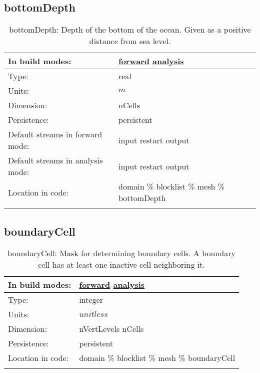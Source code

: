 \subsection[bottomDepth]{bottomDepth}
\label{subsec:var_sec_mesh_bottomDepth}
\begin{center}
\begin{longtable}{| p{2.0in} | p{4.0in} |}
        \hline 
        In build modes: & \hyperref[subsec:forward_var_tab_mesh]{forward} \hyperref[subsec:analysis_var_tab_mesh]{analysis} \\
        \hline 
        Type: & real \\
        \hline 
        Units: & $m$ \\
        \hline 
        Dimension: & nCells \\
        \hline 
        Persistence: & persistent \\
        \hline 
		 Default streams in forward mode: &  input restart output \\
        \hline 
		 Default streams in analysis mode: &  input restart output \\
        \hline 
		 Location in code: & domain \% blocklist \% mesh \% bottomDepth \\
		 \hline 
    \caption{bottomDepth: Depth of the bottom of the ocean. Given as a positive distance from sea level.}
\end{longtable}
\end{center}
\subsection[boundaryCell]{boundaryCell}
\label{subsec:var_sec_mesh_boundaryCell}
\begin{center}
\begin{longtable}{| p{2.0in} | p{4.0in} |}
        \hline 
        In build modes: & \hyperref[subsec:forward_var_tab_mesh]{forward} \hyperref[subsec:analysis_var_tab_mesh]{analysis} \\
        \hline 
        Type: & integer \\
        \hline 
        Units: & $unitless$ \\
        \hline 
        Dimension: & nVertLevels nCells \\
        \hline 
        Persistence: & persistent \\
        \hline 
		 Location in code: & domain \% blocklist \% mesh \% boundaryCell \\
		 \hline 
    \caption{boundaryCell: Mask for determining boundary cells. A boundary cell has at least one inactive cell neighboring it.}
\end{longtable}
\end{center}
